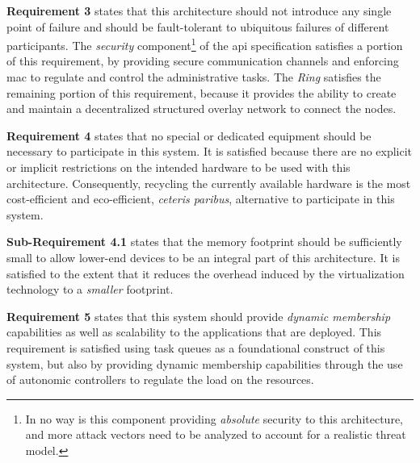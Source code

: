 \documentclass[12pt, titlepage]{uo_temp}
\begin{document}
     \textbf{Requirement 3} states that this architecture should not introduce any single
     point of failure and should be fault-tolerant to ubiquitous failures of different
     participants. The \emph{security} component\footnote{In no way is this component
       providing \emph{absolute} security to this architecture, and more attack vectors
       need to be analyzed to account for a realistic threat model.} of the \gls{api}
     specification satisfies a portion of this requirement, by providing secure
     communication channels and enforcing \gls{mac} to regulate and control the
     administrative tasks. The \emph{Ring} satisfies the remaining portion of this
     requirement, because it provides the ability to create and maintain a decentralized
     structured overlay network to connect the nodes.

     \textbf{Requirement 4} states that no special or dedicated equipment should be
     necessary to participate in this system. It is satisfied because there are no
     explicit or implicit restrictions on the intended hardware to be used with this
     architecture. Consequently, recycling the currently available hardware is the most
     cost-efficient and eco-efficient, \emph{ceteris paribus}, alternative to participate
     in this system.
     
     \textbf{Sub-Requirement 4.1} states that the memory footprint should be sufficiently
     small to allow lower-end devices to be an integral part of this architecture. It is
     satisfied to the extent that it reduces the overhead induced by the virtualization
     technology to a \emph{smaller} footprint.
     
     \textbf{Requirement 5} states that this system should provide \emph{dynamic
       membership} capabilities as well as scalability to the applications that are
     deployed. This requirement is satisfied using task queues as a foundational construct
     of this system, but also by providing dynamic membership capabilities through the use
     of autonomic controllers to regulate the load on the resources.
\end{document}
